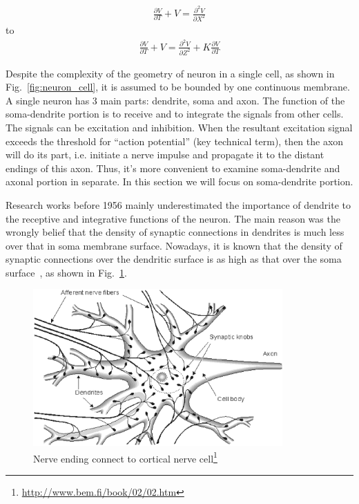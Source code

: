 \begin{eqnarray}
  \label{eq:484}
      \frac{\partial V}{\partial T}  + V=
   \frac{\partial^2V}{\partial X^2} 
\end{eqnarray}
to 
\begin{eqnarray}
  \label{eq:483}
    \frac{\partial V}{\partial T} + V  =
   \frac{\partial^2V}{\partial Z^2} + K\frac{\partial V}{\partial T}
\end{eqnarray}

Despite the complexity of the geometry of neuron in a single cell, as
shown in Fig.~\ref{fig:neuron_cell}, it is assumed to be bounded by
one continuous membrane. A single neuron has 3 main parts: dendrite,
soma and axon.  The function of the soma-dendrite portion is to
receive and to integrate the signals from other cells. The signals can
be excitation and inhibition. When the resultant excitation signal
exceeds the threshold for ``action potential'' (key technical term),
then the axon will do its part, i.e. initiate a nerve impulse and
propagate it to the distant endings of this axon.  Thus, it's more
convenient to examine soma-dendrite and axonal portion in separate. In
this section we will focus on soma-dendrite portion.


Research works before 1956 mainly underestimated the importance of
dendrite to the receptive and integrative functions of the neuron. The
main reason was the wrongly belief that the density of synaptic
connections in dendrites is much less over that in soma membrane
surface. Nowadays, it is known that the density of synaptic
connections over the dendritic surface is as high as that over the
soma surface~\cite{rall1960mpt}, as shown in
Fig.~\ref{fig:synaptic_connection}.
 
\begin{figure}[hbt]
  \centerline{\includegraphics[height=6cm,
    angle=0]{./images/synaptic_connection.eps}}
\caption{Nerve ending connect to cortical nerve cell\footnote{\url{http://www.bem.fi/book/02/02.htm}}}
\label{fig:synaptic_connection}
\end{figure}



